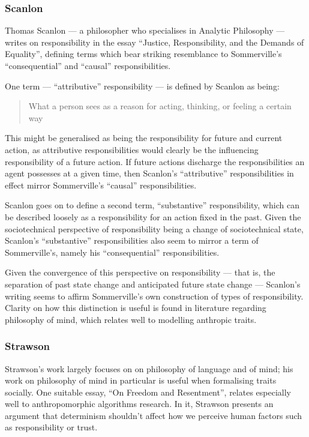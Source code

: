 \subsubsection{Scanlon~\cite{scanlon2006justice}}  %
Thomas Scanlon --- a philosopher who specialises in Analytic Philosophy --- writes on responsibility in the essay ``Justice, Responsibility, and the Demands of Equality'', defining terms which bear striking resemblance to Sommerville's ``consequential'' and ``causal'' responsibilities.\par

One term --- ``attributive'' responsibility --- is defined by Scanlon as being:

\begin{quotation}
    What a person sees as a reason for acting, thinking, or feeling a certain way\cite{scanlon2006justice}
\end{quotation}

This might be generalised as being the responsibility for future and current action, as attributive responsibilities would clearly be the influencing responsibility of a future action. If future actions discharge the responsibilities an agent possesses at a given time, then Scanlon's ``attributive'' responsibilities in effect mirror Sommerville's ``causal'' responsibilities.\par

Scanlon goes on to define a second term, ``substantive'' responsibility, which can be described loosely as a responsibility for an action fixed in the past. Given the sociotechnical perspective of responsibility being a change of sociotechnical state, Scanlon's ``substantive'' responsibilities also seem to mirror a term of Sommerville's, namely his ``consequential'' responsibilities.\par

Given the convergence of this perspective on responsibility --- that is, the separation of past state change and anticipated future state change --- Scanlon's writing seems to affirm Sommerville's own construction of types of responsibility. Clarity on how this distinction is useful is found in literature regarding philosophy of mind, which relates well to modelling anthropic traits.\par

\subsubsection{Strawson~\cite{strawson}}\label{subsec:strawson}  %
Strawson's work largely focuses on on philosophy of language and of mind; his work on philosophy of mind in particular is useful when formalising traits socially. One suitable essay, ``On Freedom and Resentment''\cite{strawson}, relates especially well to anthropomorphic algorithms research. In it, Strawson presents an argument that determinism shouldn't affect how we perceive human factors such as responsibility or trust.\par

